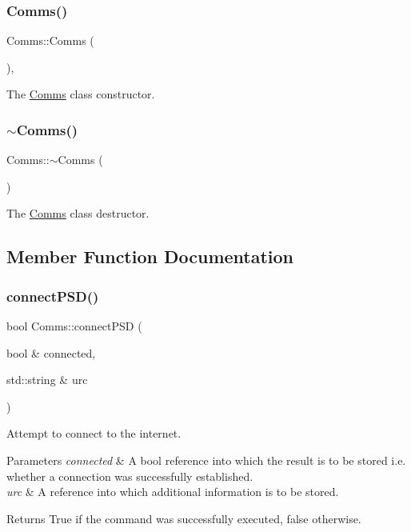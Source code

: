 \subsubsection{\texorpdfstring{Comms()}{Comms()}}
{\footnotesize\ttfamily Comms\+::\+Comms (\begin{DoxyParamCaption}{ }\end{DoxyParamCaption})\hspace{0.3cm}{\ttfamily [explicit]}, {\ttfamily [default]}}

The \hyperlink{class_comms}{Comms} class constructor. \mbox{\label{class_comms_ad18d3a80a82d18d27b0de3b551e4f5fc}} 
\subsubsection{\texorpdfstring{$\sim$\+Comms()}{~Comms()}}
{\footnotesize\ttfamily Comms\+::$\sim$\+Comms (\begin{DoxyParamCaption}{ }\end{DoxyParamCaption})\hspace{0.3cm}{\ttfamily [default]}}

The \hyperlink{class_comms}{Comms} class destructor. 

\subsection{Member Function Documentation}
\mbox{\label{class_comms_a6d720b51b543ec05b140efdde4cca824}} 
\subsubsection{\texorpdfstring{connect\+P\+S\+D()}{connectPSD()}}
{\footnotesize\ttfamily bool Comms\+::connect\+P\+SD (\begin{DoxyParamCaption}\item[{bool \&}]{connected,  }\item[{std\+::string \&}]{urc }\end{DoxyParamCaption})}

Attempt to connect to the internet.


\begin{DoxyParams}{Parameters}
{\em connected} & A bool reference into which the result is to be stored i.\+e. whether a connection was successfully established. \\
\hline
{\em urc} & A reference into which additional information is to be stored. \\
\hline
\end{DoxyParams}
\begin{DoxyReturn}{Returns}
True if the command was successfully executed, false otherwise. 
\end{DoxyReturn}


